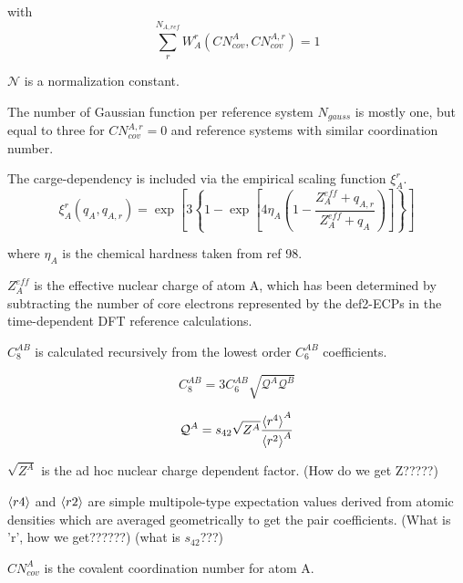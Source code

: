 \documentclass{article}
\begin{document}
with
\begin{equation}
  \sum_{r}^{N_{A,ref}} W_A^r(CN_{cov}^A, CN_{cov}^{A,r}) = 1
\end{equation}

\vspace{10pt}
\noindent
\(\mathcal{N}\) is a normalization constant.

\noindent
The number of Gaussian function per reference system \(N_{gauss}\) is mostly one, but equal to three for \(CN_{cov}^{A,r} = 0\) and reference systems with similar coordination number.

\noindent
The carge-dependency is included via the empirical scaling function \(\xi_A^r\).
\begin{equation}
  \xi_A^r(q_A, q_{A,r}) = \exp\left[3\left\{1-\exp\left[4\eta_A\left(1-\frac{Z_A^{eff} + q_{A,r}}{Z_A^{eff} + q_A}\right)\right]\right\}\right]
\end{equation}

\noindent
where \(\eta_A\) is the chemical hardness taken from ref 98.

\noindent
\(Z_A^{eff}\) is the effective nuclear charge of atom A, which has been determined by subtracting the number of core electrons represented by the def2-ECPs in the time-dependent DFT reference calculations.



\vspace{10pt}
\noindent
\(C_8^{AB}\) is calculated recursively from the lowest order \(C_6^{AB}\) coefficients.

\begin{equation}
  C_8^{AB} = 3C_6^{AB} \sqrt{\mathcal{Q}^A\mathcal{Q}^B}
\end{equation}

\begin{equation}
  \mathcal{Q}^A = s_{42} \sqrt{Z^A} \frac{\braket{r^4}^A}{\braket{r^2}^A}
\end{equation}


\vspace{10pt}
\noindent
\(\sqrt{Z^A}\) is the ad hoc nuclear charge dependent factor. (How do we get Z?????)

\(\braket{r4}\) and \(\braket{r2}\) are simple multipole-type expectation values derived from atomic densities which are averaged geometrically to get the pair coefficients. (What is 'r', how we get??????) (what is \(s_{42}\)???)

\vspace{20pt}
\noindent
\(CN^A_{cov}\) is the covalent coordination number for atom A.
\end{document}
